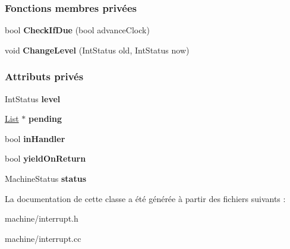 \subsubsection*{Fonctions membres privées}
\begin{DoxyCompactItemize}
\item 
\hypertarget{class_interrupt_ab5adc6b35b5820fe525d8fcdf6229273}{}\label{class_interrupt_ab5adc6b35b5820fe525d8fcdf6229273} 
bool {\bfseries Check\+If\+Due} (bool advance\+Clock)
\item 
\hypertarget{class_interrupt_ad83e8709b967745b6614ea7f75c446d7}{}\label{class_interrupt_ad83e8709b967745b6614ea7f75c446d7} 
void {\bfseries Change\+Level} (Int\+Status old, Int\+Status now)
\end{DoxyCompactItemize}
\subsubsection*{Attributs privés}
\begin{DoxyCompactItemize}
\item 
\hypertarget{class_interrupt_a558467f06f3d1945f63726738b93191e}{}\label{class_interrupt_a558467f06f3d1945f63726738b93191e} 
Int\+Status {\bfseries level}
\item 
\hypertarget{class_interrupt_a9f390f53a1c4bafd39ef6d0c27834c7e}{}\label{class_interrupt_a9f390f53a1c4bafd39ef6d0c27834c7e} 
\hyperlink{class_list}{List} $\ast$ {\bfseries pending}
\item 
\hypertarget{class_interrupt_a5ea5d05ea85a95979a51b6450433ca10}{}\label{class_interrupt_a5ea5d05ea85a95979a51b6450433ca10} 
bool {\bfseries in\+Handler}
\item 
\hypertarget{class_interrupt_a97d372b8fa7a2061fce62068bcb053c5}{}\label{class_interrupt_a97d372b8fa7a2061fce62068bcb053c5} 
bool {\bfseries yield\+On\+Return}
\item 
\hypertarget{class_interrupt_a270e2391b397151f55939dd57349edf9}{}\label{class_interrupt_a270e2391b397151f55939dd57349edf9} 
Machine\+Status {\bfseries status}
\end{DoxyCompactItemize}


La documentation de cette classe a été générée à partir des fichiers suivants \+:\begin{DoxyCompactItemize}
\item 
machine/interrupt.\+h\item 
machine/interrupt.\+cc\end{DoxyCompactItemize}
